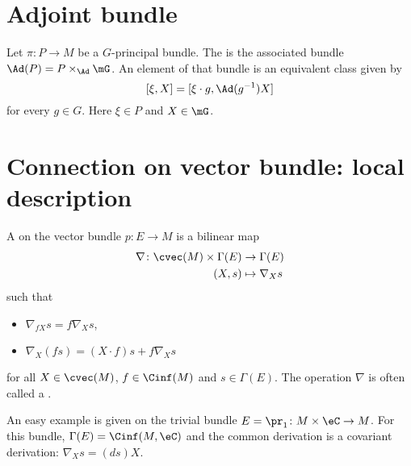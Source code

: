 

\section{Adjoint bundle}

Let $\pi\colon P\to M$ be a $G$-principal bundle. The  is the associated bundle $\Ad(P)=P\times_{\Ad}\mG$. An element of that bundle is an equivalent class given by
\[ 
  [\xi,X]=[\xi\cdot g,\Ad(g^{-1})X]
\]
for every $g\in G$. Here $\xi\in P$ and $X\in\mG$.

\section{Connection on vector bundle: local description}\label{sec:conn_vect}

\begin{definition}      \label{DEFooIESVooGNQHzl}
    A  on the vector bundle $p\colon E\to M$ is a bilinear map
    \begin{equation}
        \begin{aligned}
                \nabla \colon \cvec(M)\times\Gamma(E) &\to \Gamma(E)\\
                (X,s)&\mapsto \nabla_Xs
        \end{aligned}
    \end{equation}
     such that 
     \begin{itemize}
     \item $\nabla_{fX}s=f\nabla_Xs$,
     \item $\nabla_X(fs)=(X\cdot f)s+f\nabla_Xs$
     \end{itemize}
    for all $X\in\cvec(M)$, $f\in\Cinf(M)$ and $s\in\Gamma(E)$. The operation $\nabla$ is often called a .
\end{definition}

An easy example is given on the trivial bundle $E=\pr_1\colon M\times\eC\to M$. For this bundle, $\Gamma(E)=\Cinf(M,\eC)$ and the common derivation is a covariant derivation: $\nabla_Xs=(ds)X$.

